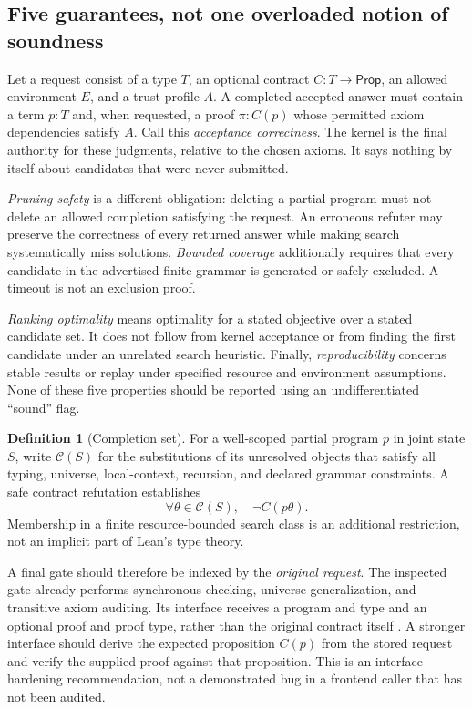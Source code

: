 \documentclass[11pt,a4paper]{article}
\theoremstyle{definition}
\newtheorem{definition}[theorem]{Definition}
\theoremstyle{remark}
\newcommand{\Prop}{\mathsf{Prop}}
\begin{document}
\subsection{Five guarantees, not one overloaded notion of soundness}
Let a request consist of a type $T$, an optional contract $C:T\to\Prop$, an
allowed environment $E$, and a trust profile $A$. A completed accepted answer
must contain a term $p:T$ and, when requested, a proof $\pi:C(p)$ whose permitted
axiom dependencies satisfy $A$. Call this \emph{acceptance correctness}.
The kernel is the final authority for these judgments, relative to the chosen
axioms. It says nothing by itself about candidates that were never submitted.

\emph{Pruning safety} is a different obligation: deleting a partial program
must not delete an allowed completion satisfying the request. An erroneous
refuter may preserve the correctness of every returned answer while making
search systematically miss solutions. \emph{Bounded coverage} additionally
requires that every candidate in the advertised finite grammar is generated
or safely excluded. A timeout is not an exclusion proof.

\emph{Ranking optimality} means optimality for a stated objective over a stated
candidate set. It does not follow from kernel acceptance or from finding the
first candidate under an unrelated search heuristic. Finally,
\emph{reproducibility} concerns stable results or replay under specified resource
and environment assumptions. None of these five properties should be reported
using an undifferentiated ``sound'' flag.

\begin{definition}[Completion set]
For a well-scoped partial program $p$ in joint state $S$, write
$\mathcal C(S)$ for the substitutions of its unresolved objects that satisfy
all typing, universe, local-context, recursion, and declared grammar
constraints. A safe contract refutation establishes
\[
 \forall\theta\in\mathcal C(S),\quad \neg C(p\theta).
 \tag{1}\label{eq:refutation}
\]
Membership in a finite resource-bounded search class is an additional
restriction, not an implicit part of Lean's type theory.
\end{definition}

A final gate should therefore be indexed by the \emph{original request}. The
inspected gate already performs synchronous checking, universe generalization,
and transitive axiom auditing. Its interface receives a program and type and an
optional proof and proof type, rather than the original contract itself
\cite{srcgate}. A stronger interface should derive the expected proposition
$C(p)$ from the stored request and verify the supplied proof against that
proposition. This is an interface-hardening recommendation, not a demonstrated
bug in a frontend caller that has not been audited.
\end{document}
